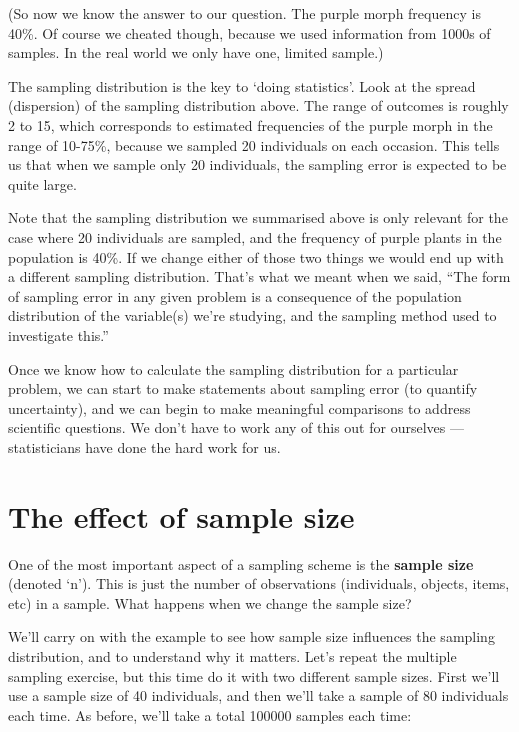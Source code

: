 \documentclass[]{book}
\begin{document}
(So now we know the answer to our question. The purple morph frequency
is 40\%. Of course we cheated though, because we used information from
1000s of samples. In the real world we only have one, limited sample.)

The sampling distribution is the key to `doing statistics'. Look at the
spread (dispersion) of the sampling distribution above. The range of
outcomes is roughly 2 to 15, which corresponds to estimated frequencies
of the purple morph in the range of 10-75\%, because we sampled 20
individuals on each occasion. This tells us that when we sample only 20
individuals, the sampling error is expected to be quite large.

Note that the sampling distribution we summarised above is only relevant
for the case where 20 individuals are sampled, and the frequency of
purple plants in the population is 40\%. If we change either of those
two things we would end up with a different sampling distribution.
That's what we meant when we said, ``The form of sampling error in any
given problem is a consequence of the population distribution of the
variable(s) we're studying, and the sampling method used to investigate
this.''

Once we know how to calculate the sampling distribution for a particular
problem, we can start to make statements about sampling error (to
quantify uncertainty), and we can begin to make meaningful comparisons
to address scientific questions. We don't have to work any of this out
for ourselves --- statisticians have done the hard work for us.

\section{The effect of sample size}\label{the-effect-of-sample-size}

One of the most important aspect of a sampling scheme is the
\textbf{sample size} (denoted `n'). This is just the number of
observations (individuals, objects, items, etc) in a sample. What
happens when we change the sample size?

We'll carry on with the example to see how sample size influences the
sampling distribution, and to understand why it matters. Let's repeat
the multiple sampling exercise, but this time do it with two different
sample sizes. First we'll use a sample size of 40 individuals, and then
we'll take a sample of 80 individuals each time. As before, we'll take a
total 100000 samples each time:
\end{document}
